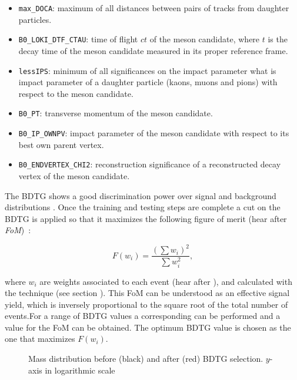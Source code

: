 \begin{itemize}
\item{} \texttt{max\_DOCA}: maximum of all distances between pairs of tracks from daughter particles.
\item{} \texttt{B0\_LOKI\_DTF\_CTAU}: time of flight $ct$ of the \Bs meson candidate, where
$t$ is the decay time of the \Bs meson candidate measured in its proper reference frame.
\item{} \texttt{lessIPS}: minimum of all significances on the impact parameter {\color{red} what is impact parameter} of a daughter particle (kaons, muons and pions) with respect to the \Bs meson candidate.
\item{} \texttt{B0\_PT}: transverse momentum of the \Bs meson candidate.
\item{} \texttt{B0\_IP\_OWNPV}: impact parameter of the \Bs meson candidate with respect to its best own parent vertex.
\item{} \texttt{B0\_ENDVERTEX\_CHI2}: reconstruction significance of a reconstructed decay vertex of the \Bs meson candidate.
\end{itemize}

The BDTG shows a good discrimination power over signal and background distributions .
Once the training and testing steps are complete a cut on the BDTG is applied so that it maximizes the following figure of merit
(hear after {\it FoM})~\cite{Yuehong_fom}:

\begin{equation}
\label{eqn:fom}
F(w_i) = \frac{\left(\sum{w_{i}}\right)^2}{\sum{w_{i}^2}},
\end{equation}

\noindent where $w_i$ are weights associated to each event (hear after \sWeights), and calculated with the \sPlot technique (see section ). 
This FoM can be understood as an effective signal yield, which is inversely proportional to the square root of the total number of events.For a range of BDTG values
a corresponding \sPlot can be performed and a value for the FoM can be obtained. The optimum BDTG value is chosen as the one that maximizes $F(w_i)$.


\begin{figure}[h]
\begin{center}
\scalebox{1}{}
\caption{Mass distribution before (black) and after (red) BDTG selection. $y$-axis in logarithmic scale}
\label{mass_BDTG_selection}
\end{center}
\end{figure}

